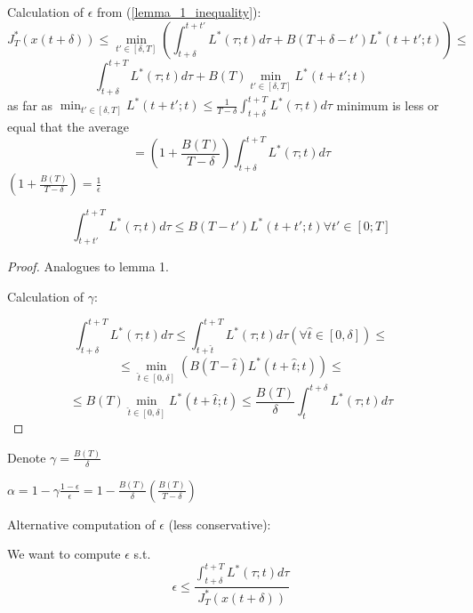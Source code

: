 Calculation of $\epsilon$ from (\ref{lemma_1_inequality}):
\begin{equation*}
J^*_T(x(t+\delta)) \leq \min_{t' \in [\delta,T]}(\int_{t+\delta}^{t+t'}L^*(\tau;t)d\tau + B(T+\delta-t')L^*(t+t';t)) \leq
\end{equation*}
\begin{equation*}
\int_{t+\delta}^{t+T}L^*(\tau;t)d\tau + B(T) \min_{t'\in[\delta,T]}L^*(t+t';t)
\end{equation*}
as far as 
$\min_{t'\in[\delta,T]}L^*(t+t';t) \leq \frac{1}{T-\delta}\int_{t+\delta}^{t+T}L^*(\tau;t)d\tau$
minimum is less or equal that the average
\begin{equation*}
=(1+\frac{B(T)}{T-\delta})\int_{t+\delta}^{t+T}L^*(\tau;t)d\tau
\end{equation*}
$(1+\frac{B(T)}{T-\delta}) = \frac{1}{\epsilon}$

\begin{Lemma}

\begin{equation*}
\int_{t+t'}^{t+T}L^*(\tau;t)d\tau \leq B(T-t')L^*(t+t';t) \forall t' \in [0;T]
\end{equation*}

\begin{proof}
Analogues to lemma 1.

Calculation of $\gamma$:

\begin{equation*}
\int_{t+\delta}^{t+T} L^*(\tau;t)d\tau \leq \int_{t+\hat t}^{t+T}L^*(\tau;t)d\tau (\forall \hat t \in [0,\delta]) \leq
\end{equation*}
\begin{equation*}
\leq \min_{\hat t \in [0, \delta]}(B(T-\hat t)L^*(t+\hat t;t)) \leq
\end{equation*}
\begin{equation*}
\leq B(T)\min_{\hat t \in [0,\delta]}L^*(t+\hat t;t) \leq \frac{B(T)}{\delta}\int_{t}^{t+\delta}L^*(\tau;t)d\tau
\end{equation*}
\end{proof}
\end{Lemma}

Denote $\gamma = \frac{B(T)}{\delta}$

$\alpha = 1 - \gamma \frac{1-\epsilon}{\epsilon} = 1 - \frac{B(T)}{\delta}(\frac{B(T)}{T-\delta})$

Alternative computation of $\epsilon$ (less conservative):

We want to compute $\epsilon$ s.t.
\begin{equation*}
\epsilon \leq \frac{\int_{t+\delta}^{t+T}L^*(\tau;t)d\tau}{J_T^*(x(t+\delta))}
\end{equation*}

